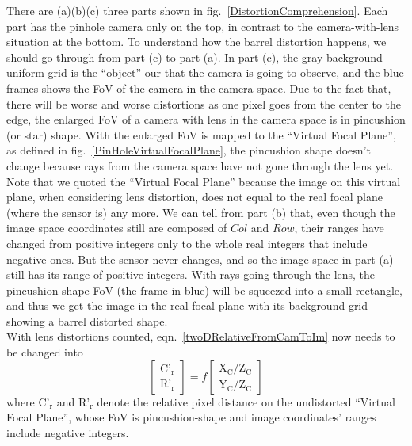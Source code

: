 There are (a)(b)(c) three parts shown in fig.~\ref{DistortionComprehension}. Each part has the pinhole camera only on the top, in contrast to the camera-with-lens situation at the bottom. To understand how the barrel distortion happens, we should go through from part (c) to part (a). In part (c), the gray background uniform grid is the \enquote{object} our that the camera is going to observe, and the blue frames shows the FoV of the camera in the camera space. Due to the fact that, there will be worse and worse distortions as one pixel goes from the center to the edge, the enlarged FoV of a camera with lens in the camera space is in pincushion (or star) shape. With the enlarged FoV is mapped to the \enquote{Virtual Focal Plane}, as defined in fig.~\ref{PinHoleVirtualFocalPlane}, the pincushion shape doesn't change because rays from the camera space have not gone through the lens yet. Note that we quoted the \enquote{Virtual Focal Plane} because the image on this virtual plane, when considering lens distortion, does not equal to the real focal plane (where the sensor is) any more. We can tell from part (b) that, even though the image space coordinates still are composed of \(Col\) and \(Row\), their ranges have changed from positive integers only to the whole real integers that include negative ones. But the sensor never changes, and so the image space in part (a) still has its range of positive integers. With rays going through the lens, the pincushion-shape FoV (the frame in blue) will be squeezed into a small rectangle, and thus we get the image in the real focal plane with its background grid showing a barrel distorted shape.%
\\\indent%
With lens distortions counted, eqn.~\ref{twoDRelativeFromCamToIm} now needs to be changed into 
%
\begin{equation}
\left[ \begin{array}{c} \text{C'}_\text{r} \\ \text{R'}_\text{r} \end{array} \right] %
= f %
\left[ \begin{array}{c} \text{X}_\text{C}/\text{Z}_\text{C} \\ \text{Y}_\text{C}/\text{Z}_\text{C} \end{array} \right]%
\label{undistortedRelativeFromCamToIm}
\end{equation}
where \(\text{C'}_\text{r}\) and \(\text{R'}_\text{r}\) denote the relative pixel distance on the undistorted \enquote{Virtual Focal Plane}, whose FoV is pincushion-shape and image coordinates' ranges include negative integers.%
